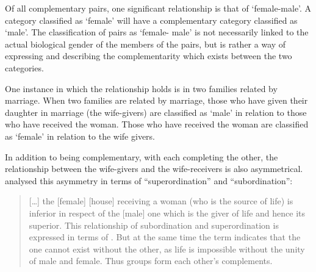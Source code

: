 Of all complementary pairs, one significant relationship
is that of  `female-male'.
A category classified as  `female'
will have a complementary category classified as  `male'.
The classification of pairs as  `female- male'
is not necessarily linked to the actual biological gender
of the members of the pairs,
but is rather a way of expressing and describing
the complementarity which exists between the two categories.

One instance in which the  relationship holds
is in two families related by marriage.
When two families are related by marriage, those who have given their daughter
in marriage (the wife-givers) are classified as  `male'
in relation to those who have received the woman.
Those who have received the woman are classified
as  `female' in relation to the wife givers.


In addition to being complementary, with each completing the other,
the relationship between the wife-givers and
the wife-receivers is also asymmetrical.
\cite{scno71} analysed this asymmetry in terms of
``superordination'' and ``subordination'':

\begin{quote}
[\ldots] the [female]  [house] receiving a woman (who is the source of life)
is inferior in respect of the [male] one which is the giver of life and hence its superior.
This relationship of subordination and superordination is expressed in terms of .
But at the same time the term  indicates that the one cannot exist without the other,
as life is impossible without the unity of male and female.
Thus  groups form each other's complements. \hfill\citep[411]{scno71}
\end{quote}

